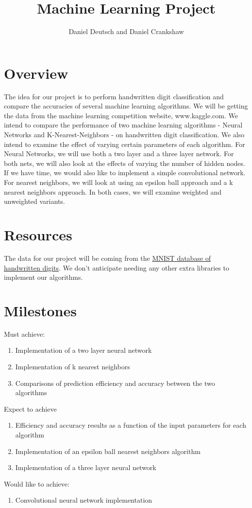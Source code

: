 \documentclass[11pt,a4paper]{article}
\author{Daniel Deutsch and Daniel Crankshaw}
\title{Machine Learning Project}
\date{}
\begin{document}
\maketitle
\section*{Overview}
The idea for our project is to perform handwritten digit classification and compare the accuracies of several machine learning algorithms. We will be getting the data from the machine learning competition website, www.kaggle.com. We intend to compare the performance of two machine learning algorithms - Neural Networks and K-Nearest-Neighbors - on handwritten digit classification. We also intend to examine the effect of varying certain parameters of each algorithm. For Neural Networks, we will use both a two layer and a three layer network. For both nets, we will also look at the effects of varying the number of hidden nodes. If we have time, we would also like to implement a simple convolutional network. For nearest neighbors, we will look at using an epsilon ball approach and a k nearest neighbors approach. In both cases, we will examine weighted and unweighted variants.

\section*{Resources}
The data for our project will be coming from the \href{http://yann.lecun.com/exdb/mnist/index.html}{MNIST database of handwritten digits}. We don’t anticipate needing any other extra libraries to implement our algorithms.

\section*{Milestones}
Must achieve:
\begin{enumerate}
\item Implementation of a two layer neural network
\item Implementation of k nearest neighbors
\item Comparisons of prediction efficiency and accuracy between the two algorithms
\end{enumerate}
Expect to achieve
\begin{enumerate}
\item Efficiency and accuracy results as a function of the input parameters for each algorithm
\item Implementation of an epsilon ball nearest neighbors algorithm
\item Implementation of a three layer neural network
\end{enumerate}
Would like to achieve:
\begin{enumerate}
\item Convolutional neural network implementation
\end{enumerate}
\end{document}
